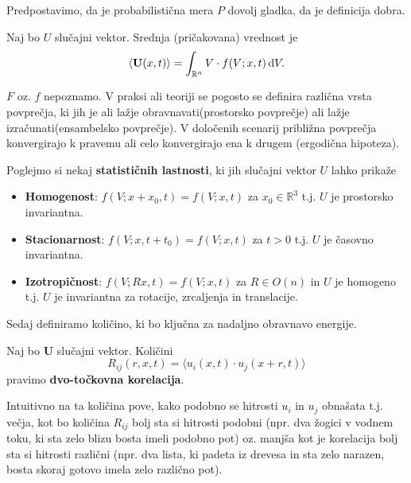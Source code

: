\documentclass[mat2, tisk]{fmfdelo}
\newcommand{\R}{\mathbb R}
\newcommand{\bd}{\textbf}
\begin{document}
\begin{opomba}
Predpostavimo, da je probabilistična mera $P$ dovolj gladka, da je definicija dobra.
\end{opomba}

\begin{definicija}
Naj bo $U$ slučajni vektor. Srednja (pričakovana) vrednost je 
\begin{equation}
\langle \bd{U}(x, t) \rangle = \int_{\R^n} V \cdot f(V; x, t) \dif V.
\end{equation}
\end{definicija}

$F$ oz. $f$ nepoznamo. V praksi ali teoriji se pogosto se definira različna vrsta povprečja, 
ki jih je ali lažje obravnavati(prostorsko povprečje) ali lažje izračunati(ensambelsko povprečje).
V določenih scenarij približna povprečja konvergirajo k pravemu 
ali celo konvergirajo ena k drugem (ergodična hipoteza). 

Poglejmo si nekaj \textbf{statističnih lastnosti}, ki jih slučajni 
vektor $U$ lahko prikaže
\begin{itemize}
  \item \textbf{Homogenost}: $f(V; x + x_0, t) = f(V; x, t)$ za $x_0 \in \R^3$ t.j. $U$ je 
  prostorsko invariantna.
  \item \textbf{Stacionarnost}: $f(V; x, t + t_0) = f(V; x, t)$ za $t>0$ t.j. $U$ je 
  časovno invariantna. 
  \item \textbf{Izotropičnost}: $f(V; Rx, t) = f(V; x, t)$ za $R\in O(n)$ in $U$ je homogeno t.j. $U$ je 
  invariantna za rotacije, zrcaljenja in translacije. 
\end{itemize} 

Sedaj definiramo količino, ki bo ključna za nadaljno obravnavo 
energije.

\begin{definicija}
Naj bo $\bd{U}$ slučajni vektor. Količini 
\begin{equation}
R_{ij}(r, x, t) = \langle u_i(x, t)\cdot u_j(x + r, t)\rangle
\end{equation}
pravimo \textbf{dvo-točkovna korelacija}.
\end{definicija}

Intuitivno na ta količina pove, kako podobno se hitrosti $u_i$ in 
$u_j$ obnašata t.j. večja, kot bo količina $R_{ij}$ bolj sta si hitrosti 
podobni (npr. dva žogici v vodnem toku, ki sta zelo blizu bosta imeli podobno pot) oz. 
manjša kot je korelacija bolj sta si hitrosti različni (npr. dva lista, ki padeta 
iz drevesa in sta zelo narazen, bosta skoraj gotovo imela zelo različno pot).
\end{document}
